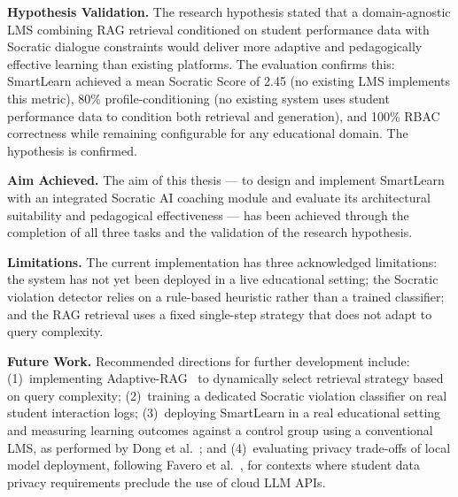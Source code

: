 \documentclass[12pt,a4paper]{report}
\begin{document}
\noindent\textbf{Hypothesis Validation.} The research hypothesis stated that a domain-agnostic
LMS combining RAG retrieval conditioned on student performance data with Socratic dialogue
constraints would deliver more adaptive and pedagogically effective learning than existing
platforms. The evaluation confirms this: SmartLearn achieved a mean Socratic Score of 2.45 (no
existing LMS implements this metric), 80\% profile-conditioning (no existing system uses student
performance data to condition both retrieval and generation), and 100\% RBAC correctness while
remaining configurable for any educational domain. The hypothesis is confirmed.

\noindent\textbf{Aim Achieved.} The aim of this thesis --- to design and implement SmartLearn
with an integrated Socratic AI coaching module and evaluate its architectural suitability and
pedagogical effectiveness --- has been achieved through the completion of all three tasks and
the validation of the research hypothesis.

\noindent\textbf{Limitations.} The current implementation has three acknowledged limitations:
the system has not yet been deployed in a live educational setting; the Socratic violation
detector relies on a rule-based heuristic rather than a trained classifier; and the RAG
retrieval uses a fixed single-step strategy that does not adapt to query complexity.

\noindent\textbf{Future Work.} Recommended directions for further development include:
(1)~implementing Adaptive-RAG~\cite{ref13} to dynamically select retrieval strategy based on
query complexity; (2)~training a dedicated Socratic violation classifier on real student
interaction logs; (3)~deploying SmartLearn in a real educational setting and measuring learning
outcomes against a control group using a conventional LMS, as performed by Dong et
al.~\cite{ref1}; and (4)~evaluating privacy trade-offs of local model deployment, following
Favero et al.~\cite{ref7}, for contexts where student data privacy requirements preclude the
use of cloud LLM APIs.
\end{document}
